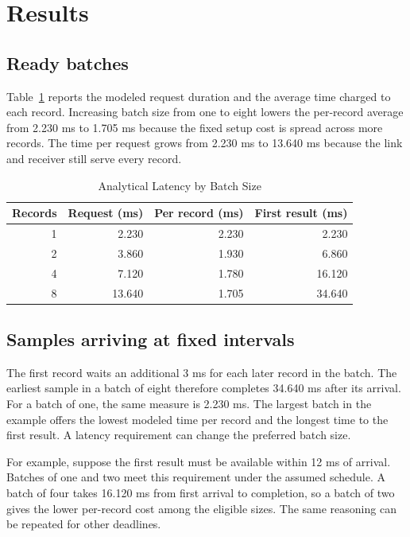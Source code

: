 \section{Results}

\subsection{Ready batches}

Table~\ref{tab:results} reports the modeled request duration and the average time charged to each record. Increasing batch size from one to eight lowers the per-record average from 2.230 ms to 1.705 ms because the fixed setup cost is spread across more records. The time per request grows from 2.230 ms to 13.640 ms because the link and receiver still serve every record.

\begin{table}[!t]
\caption{Analytical Latency by Batch Size}
\label{tab:results}
\centering
\small
\begin{tabular}{@{}rrrr@{}}
\toprule
Records & Request (ms) & Per record (ms) & First result (ms)\\
\midrule
1 & 2.230 & 2.230 & 2.230\\
2 & 3.860 & 1.930 & 6.860\\
4 & 7.120 & 1.780 & 16.120\\
8 & 13.640 & 1.705 & 34.640\\
\bottomrule
\end{tabular}
\end{table}

\subsection{Samples arriving at fixed intervals}

The first record waits an additional 3 ms for each later record in the batch. The earliest sample in a batch of eight therefore completes 34.640 ms after its arrival. For a batch of one, the same measure is 2.230 ms. The largest batch in the example offers the lowest modeled time per record and the longest time to the first result. A latency requirement can change the preferred batch size.

For example, suppose the first result must be available within 12 ms of arrival. Batches of one and two meet this requirement under the assumed schedule. A batch of four takes 16.120 ms from first arrival to completion, so a batch of two gives the lower per-record cost among the eligible sizes. The same reasoning can be repeated for other deadlines.

